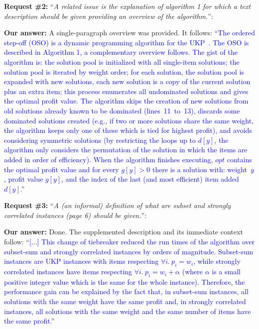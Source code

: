 \documentclass{elsarticle}
\begin{document}
\medskip

\textbf{Request \#2:} ``\textit{A related issue is the explanation of algorithm 1 for which a text description should be given providing an overview of the algorithm.}'': 

\textbf{Our answer:} A single-paragraph overview was provided. It follows: ``\textcolor{blue}{The ordered step-off (OSO) is a dynamic programming algorithm for the UKP~\citep{gg-66}.
The OSO is described in Algorithm 1, a complementary overview follows.
The gist of the algorithm is: the solution pool is initialized with all single-item solutions; the solution pool is iterated by weight order; for each solution, the solution pool is expanded with new solutions, each new solution is a copy of the current solution plus an extra item; this process enumerates all undominated solutions and gives the optimal profit value.
The algorithm skips the creation of new solutions from old solutions already known to be dominated (lines~11~to~13), discards some dominated solutions created (e.g., if two or more solutions share the same weight, the algorithm keeps only one of these which is tied for highest profit), and avoids considering symmetric solutions (by restricting the loops up to \(d[y]\), the algorithm only considers the permutation of the solution in which the items are added in order of efficiency).
When the algorithm finishes executing, \(opt\) contains the optimal profit value and for every \(g[y] > 0\) there is a solution with: weight~\(y\), profit value \(g[y]\), and the index of the last (and most efficient) item added~\(d[y]\).}''
\medskip

\textbf{Request \#3:} ``\textit{A (an informal) definition of what are subset and strongly correlated instances (page 6) should be given.}'': 

\textbf{Our answer:} Done. The supplemented description and its immediate context follow: ``\textcolor{blue}{[...] This change of tiebreaker reduced the run times of the algorithm over subset-sum and strongly correlated instances by orders of magnitude. Subset-sum instances are UKP instances with items respecting \(\forall i.~p_i = w_i\), while strongly correlated instances have items respecting \(\forall i.~p_i = w_i + \alpha\) (where \(\alpha\) is a small positive integer value which is the same for the whole instance). Therefore, the performance gain can be explained by the fact that, in subset-sum instances, all solutions with the same weight have the same profit and, in strongly correlated instances, all solutions with the same weight and the same number of items have the same profit.}''
\medskip
\end{document}
